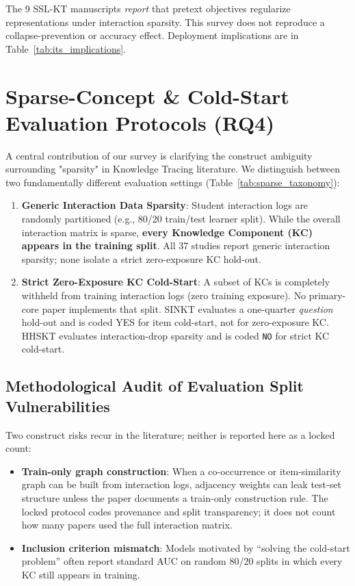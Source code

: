 \documentclass[lettersize,journal]{IEEEtran}
\begin{document}
The 9 SSL-KT manuscripts \emph{report} that pretext objectives regularize representations under interaction sparsity. This survey does not reproduce a collapse-prevention or accuracy effect. Deployment implications are in Table~\ref{tab:its_implications}.

\section{Sparse-Concept \& Cold-Start Evaluation Protocols (RQ4)}
\label{sec:sparse_coldstart}

A central contribution of our survey is clarifying the construct ambiguity surrounding "sparsity" in Knowledge Tracing literature. We distinguish between two fundamentally different evaluation settings (Table~\ref{tab:sparse_taxonomy}):
\begin{enumerate}
    \item \textbf{Generic Interaction Data Sparsity}: Student interaction logs are randomly partitioned (e.g., 80/20 train/test learner split). While the overall interaction matrix is sparse, \textbf{every Knowledge Component (KC) appears in the training split}. All 37 studies report generic interaction sparsity; none isolate a strict zero-exposure KC hold-out.
    \item \textbf{Strict Zero-Exposure KC Cold-Start}: A subset of KCs is completely withheld from training interaction logs (zero training exposure). No primary-core paper implements that split. SINKT \cite{KT044_SINKT_2024} evaluates a one-quarter \emph{question} hold-out and is coded YES for item cold-start, not for zero-exposure KC. HHSKT \cite{KT035_HHSKT_2023} evaluates interaction-drop sparsity and is coded \texttt{NO} for strict KC cold-start.
\end{enumerate}

\subsection{Methodological Audit of Evaluation Split Vulnerabilities}
Two construct risks recur in the literature; neither is reported here as a locked count:
\begin{itemize}
    \item \textbf{Train-only graph construction}: When a co-occurrence or item-similarity graph can be built from interaction logs, adjacency weights can leak test-set structure unless the paper documents a train-only construction rule. The locked protocol codes provenance and split transparency; it does not count how many papers used the full interaction matrix.
    \item \textbf{Inclusion criterion mismatch}: Models motivated by ``solving the cold-start problem'' often report standard AUC on random 80/20 splits in which every KC still appears in training.
\end{itemize}
\end{document}
